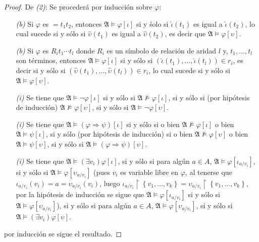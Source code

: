 \documentclass[12pt]{report}
\newcounter{it}
\theoremstyle{largebreak}
\begin{document}
\begin{proof}
        De \textit{(2)}: Se procederá por inducción sobre $\varphi$:
        \begin{itemize}
            \item[\textit{(b)}] Si $\varphi$ es $=t_1t_2$, entonces $\mathfrak{A}\vDash\varphi[\iota]$ si y śolo si $\hat{\iota}(t_1)$ es igual a $\hat{\iota}(t_2)$, lo cual sucede si y sólo si $\hat{\upsilon}(t_1)$ es igual a $\hat{\upsilon}(t_2)$, es decir que $\mathfrak{A}\vDash\varphi[\upsilon]$.
            \item[\textit{(b)}] Si $\varphi$ es $R_it_1\cdots t_l$ donde $R_i$ es un símbolo de relación de aridad $l$ y, $t_1,...,t_l$ son términos, entonces $\mathfrak{A}\vDash\varphi[\iota]$ si y sólo si $(\hat{\iota}(t_1),...,\hat{\iota}(t_l))\in r_i$, es decir si y sólo si $(\hat{\upsilon}(t_1),...,\hat{\upsilon}(t_l))\in r_i$, lo cual sucede si y sólo si $\mathfrak{A}\vDash\varphi[\upsilon]$.
            \item[\textit{(i)}] Se tiene que $\mathfrak{A}\vDash\neg\varphi[\iota]$ si y sólo si $\mathfrak{A}\nvDash\varphi[\iota]$, si y sólo si (por hipótesis de inducción) $\mathfrak{A}\nvDash\varphi[\upsilon]$, si y sólo si $\mathfrak{A}\vDash\neg\varphi[\upsilon]$.
            \item[\textit{(i)}] Se tiene que $\mathfrak{A}\vDash(\varphi\Rightarrow\psi)[\iota]$ si y sólo si o bien $\mathfrak{A}\nvDash\varphi[\iota]$ o bien $\mathfrak{A}\vDash\psi[\iota]$, si y sólo (por hipótesis de inducción) si o bien $\mathfrak{A}\nvDash\varphi[\upsilon]$ o bien $\mathfrak{A}\vDash\psi[\upsilon]$, si y sólo si $\mathfrak{A}\vDash(\varphi\Rightarrow\psi)[\upsilon]$.
            \item[\textit{(i)}] Se tiene que $\mathfrak{A}\vDash(\exists v_i)\varphi[\iota]$, si y sólo si para algún $a\in A$, $\mathfrak{A}\vDash\varphi[\iota_{a/v_i}]$, si y sólo si $\mathfrak{A}\vDash\varphi[\upsilon_{a/v_i}]$ (pues $v_i$ es variable libre en $\varphi$, al tenerse que $\iota_{ a/v_i}\left(v_i\right)=a=\upsilon_{ a/v_i}\left(v_i\right)$, luego $\iota_{ a/v_i}\upharpoonright\left\{v_1,...,v_k \right\}=\upsilon_{ a/v_i}\upharpoonright\left\{v_1,...,v_k \right\}$, por la hipótesis de inducción se sigue que $\mathfrak{A}\vDash\varphi[\iota_{ a/v_i}]$ si y sólo si $\mathfrak{A}\vDash\varphi[\upsilon_{ a/v_i}]$), si y sólo si para algún $a\in A$, $\mathfrak{A}\vDash\varphi[\upsilon_{ a/v_i}]$, si y sólo si $\mathfrak{A}\vDash(\exists v_i)\varphi[\upsilon]$.
        \end{itemize}
        por inducción se sigue el resultado.
    \end{proof}
\end{document}
